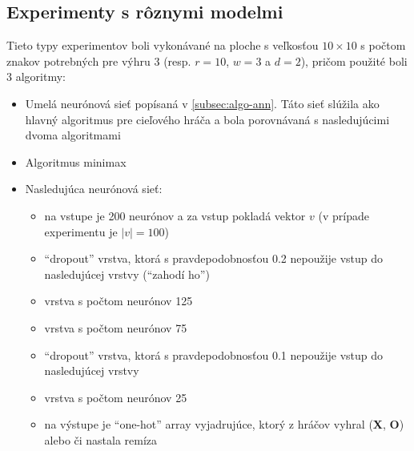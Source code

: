 \subsection{Experimenty s rôznymi modelmi}\label{subsec:experiments-versus}
Tieto typy experimentov boli vykonávané na ploche s veľkosťou $10 \times 10$ s počtom znakov potrebných pre výhru 3
(resp. $r = 10$, $w = 3$ a $d = 2$), pričom použité boli 3 algoritmy:
\begin{itemize}
    \item Umelá neurónová sieť popísaná v \autoref{subsec:algo-ann}.
    Táto sieť slúžila ako hlavný algoritmus pre cieľového hráča a bola porovnávaná s nasledujúcimi dvoma algoritmami
    \item Algoritmus minimax
    \item Nasledujúca neurónová sieť:\cite{first_ann}
    \begin{itemize}
        \item na vstupe je 200 neurónov a za vstup pokladá vektor $v$ (v prípade experimentu je $|v|=100$)
        \item \enquote{dropout} vrstva, ktorá s pravdepodobnosťou 0.2 nepoužije vstup do nasledujúcej vrstvy (\enquote{zahodí ho})
        \item vrstva s počtom neurónov 125
        \item vrstva s počtom neurónov 75
        \item \enquote{dropout} vrstva, ktorá s pravdepodobnosťou 0.1 nepoužije vstup do nasledujúcej vrstvy
        \item vrstva s počtom neurónov 25
        \item na výstupe je \enquote{one-hot} array vyjadrujúce, ktorý z hráčov vyhral (\textbf{X}, \textbf{O}) alebo či nastala remíza
    \end{itemize}
\end{itemize}

